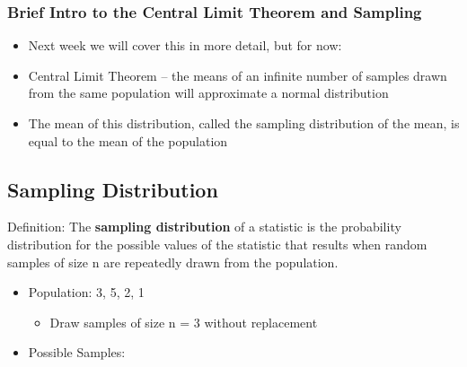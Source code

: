 \documentclass[]{article}
\begin{document}
\subsubsection{Brief Intro to the Central Limit Theorem and
Sampling}\label{brief-intro-to-the-central-limit-theorem-and-sampling}

\begin{itemize}
\item
  Next week we will cover this in more detail, but for now:
\item
  Central Limit Theorem -- the means of an infinite number of samples
  drawn from the same population will approximate a normal distribution
\item
  The mean of this distribution, called the sampling distribution of the
  mean, is equal to the mean of the population
\end{itemize}

\subsection{Sampling Distribution}\label{sampling-distribution}

Definition: The \textbf{sampling distribution} of a statistic is the
probability distribution for the possible values of the statistic that
results when random samples of size n are repeatedly drawn from the
population.

\begin{itemize}
\itemsep1pt\parskip0pt
\item
  Population: 3, 5, 2, 1

  \begin{itemize}
  \itemsep1pt\parskip0pt
  \item
    Draw samples of size n = 3 without replacement
  \end{itemize}
\item
  Possible Samples:
\end{itemize}
\end{document}
